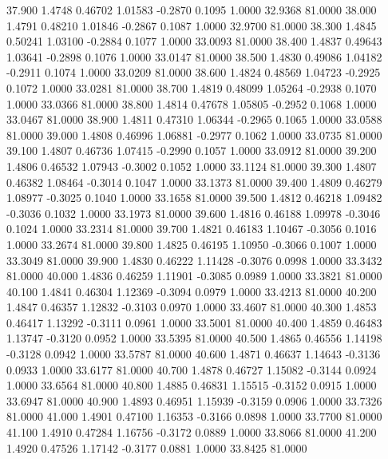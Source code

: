   37.900   1.4748   0.46702   1.01583  -0.2870   0.1095   1.0000  32.9368  81.0000
  38.000   1.4791   0.48210   1.01846  -0.2867   0.1087   1.0000  32.9700  81.0000
  38.300   1.4845   0.50241   1.03100  -0.2884   0.1077   1.0000  33.0093  81.0000
  38.400   1.4837   0.49643   1.03641  -0.2898   0.1076   1.0000  33.0147  81.0000
  38.500   1.4830   0.49086   1.04182  -0.2911   0.1074   1.0000  33.0209  81.0000
  38.600   1.4824   0.48569   1.04723  -0.2925   0.1072   1.0000  33.0281  81.0000
  38.700   1.4819   0.48099   1.05264  -0.2938   0.1070   1.0000  33.0366  81.0000
  38.800   1.4814   0.47678   1.05805  -0.2952   0.1068   1.0000  33.0467  81.0000
  38.900   1.4811   0.47310   1.06344  -0.2965   0.1065   1.0000  33.0588  81.0000
  39.000   1.4808   0.46996   1.06881  -0.2977   0.1062   1.0000  33.0735  81.0000
  39.100   1.4807   0.46736   1.07415  -0.2990   0.1057   1.0000  33.0912  81.0000
  39.200   1.4806   0.46532   1.07943  -0.3002   0.1052   1.0000  33.1124  81.0000
  39.300   1.4807   0.46382   1.08464  -0.3014   0.1047   1.0000  33.1373  81.0000
  39.400   1.4809   0.46279   1.08977  -0.3025   0.1040   1.0000  33.1658  81.0000
  39.500   1.4812   0.46218   1.09482  -0.3036   0.1032   1.0000  33.1973  81.0000
  39.600   1.4816   0.46188   1.09978  -0.3046   0.1024   1.0000  33.2314  81.0000
  39.700   1.4821   0.46183   1.10467  -0.3056   0.1016   1.0000  33.2674  81.0000
  39.800   1.4825   0.46195   1.10950  -0.3066   0.1007   1.0000  33.3049  81.0000
  39.900   1.4830   0.46222   1.11428  -0.3076   0.0998   1.0000  33.3432  81.0000
  40.000   1.4836   0.46259   1.11901  -0.3085   0.0989   1.0000  33.3821  81.0000
  40.100   1.4841   0.46304   1.12369  -0.3094   0.0979   1.0000  33.4213  81.0000
  40.200   1.4847   0.46357   1.12832  -0.3103   0.0970   1.0000  33.4607  81.0000
  40.300   1.4853   0.46417   1.13292  -0.3111   0.0961   1.0000  33.5001  81.0000
  40.400   1.4859   0.46483   1.13747  -0.3120   0.0952   1.0000  33.5395  81.0000
  40.500   1.4865   0.46556   1.14198  -0.3128   0.0942   1.0000  33.5787  81.0000
  40.600   1.4871   0.46637   1.14643  -0.3136   0.0933   1.0000  33.6177  81.0000
  40.700   1.4878   0.46727   1.15082  -0.3144   0.0924   1.0000  33.6564  81.0000
  40.800   1.4885   0.46831   1.15515  -0.3152   0.0915   1.0000  33.6947  81.0000
  40.900   1.4893   0.46951   1.15939  -0.3159   0.0906   1.0000  33.7326  81.0000
  41.000   1.4901   0.47100   1.16353  -0.3166   0.0898   1.0000  33.7700  81.0000
  41.100   1.4910   0.47284   1.16756  -0.3172   0.0889   1.0000  33.8066  81.0000
  41.200   1.4920   0.47526   1.17142  -0.3177   0.0881   1.0000  33.8425  81.0000
